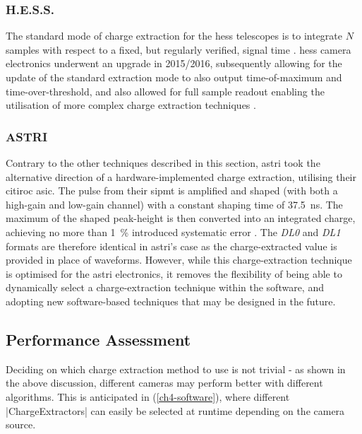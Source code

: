 \subsubsection{H.E.S.S.}

The standard mode of charge extraction for the \gls{hess} telescopes is to integrate $N$ samples with respect to a fixed, but regularly verified, signal time \cite{Aharonian2004}. \gls{hess} camera electronics underwent an upgrade in 2015/2016, subsequently allowing for the update of the standard extraction mode to also output time-of-maximum and time-over-threshold, and also allowed for full sample readout enabling the utilisation of more complex charge extraction techniques \cite{Klepser2017}\cite{Chalme-Calvet2015}.

\subsubsection{ASTRI}

Contrary to the other techniques described in this section, \gls{astri} took the alternative direction of a hardware-implemented charge extraction, utilising their \gls{citiroc} \gls{asic}. The pulse from their \gls{sipmt} is amplified and shaped (with both a high-gain and low-gain channel) with a constant shaping time of \SI{37.5}{ns}. The maximum of the shaped peak-height is then converted into an integrated charge, achieving no more than \SI{1}{\percent} introduced systematic error \cite{Impiombato2017}. The \textit{DL0} and \textit{DL1} formats are therefore identical in \gls{astri}'s case as the charge-extracted value is provided in place of waveforms. However, while this charge-extraction technique is optimised for the \gls{astri} electronics, it removes the flexibility of being able to dynamically select a charge-extraction technique within the software, and adopting new software-based techniques that may be designed in the future.

\subsection{Performance Assessment}

Deciding on which charge extraction method to use is not trivial - as shown in the above discussion, different cameras may perform better with different algorithms. This is anticipated in  (\ref{ch4-software}), where different |ChargeExtractors| can easily be selected at runtime depending on the camera source.

